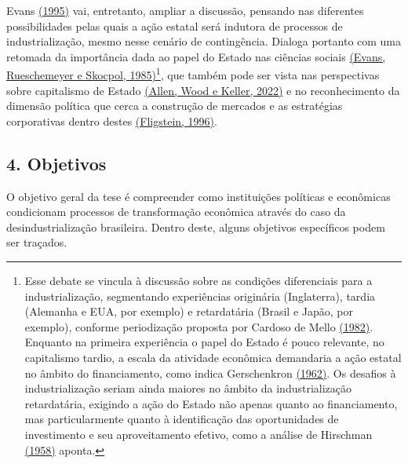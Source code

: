 Evans \href{https://www.zotero.org/google-docs/?9sf4J2}{(1995)} vai,
entretanto, ampliar a discussão, pensando nas diferentes possibilidades
pelas quais a ação estatal será indutora de processos de
industrialização, mesmo nesse cenário de contingência. Dialoga portanto
com uma retomada da importância dada ao papel do Estado nas ciências
sociais \href{https://www.zotero.org/google-docs/?nUt3EE}{(Evans,
Rueschemeyer e Skocpol, 1985)}\footnote{Esse debate se vincula à
  discussão sobre as condições diferenciais para a industrialização,
  segmentando experiências originária (Inglaterra), tardia (Alemanha e
  EUA, por exemplo) e retardatária (Brasil e Japão, por exemplo),
  conforme periodização proposta por Cardoso de Mello
  \href{https://www.zotero.org/google-docs/?xGNYgb}{(1982)}. Enquanto na
  primeira experiência o papel do Estado é pouco relevante, no
  capitalismo tardio, a escala da atividade econômica demandaria a ação
  estatal no âmbito do financiamento, como indica Gerschenkron
  \href{https://www.zotero.org/google-docs/?THn7ON}{(1962)}. Os desafios
  à industrialização seriam ainda maiores no âmbito da industrialização
  retardatária, exigindo a ação do Estado não apenas quanto ao
  financiamento, mas particularmente quanto à identificação das
  oportunidades de investimento e seu aproveitamento efetivo, como a
  análise de Hirschman
  \href{https://www.zotero.org/google-docs/?iB2ElZ}{(1958)} aponta.},
que também pode ser vista nas perspectivas sobre capitalismo de Estado
\href{https://www.zotero.org/google-docs/?jdQydT}{(Allen, Wood e Keller,
2022)} e no reconhecimento da dimensão política que cerca a construção
de mercados e as estratégias corporativas dentro destes
\href{https://www.zotero.org/google-docs/?WDxVMO}{(Fligstein, 1996)}.

\subsection{\texorpdfstring{\textbf{4.
Objetivos}}{4. Objetivos}}\label{objetivos}

O objetivo geral da tese é compreender como instituições políticas e
econômicas condicionam processos de transformação econômica através do
caso da desindustrialização brasileira. Dentro deste, alguns objetivos
específicos podem ser traçados.

